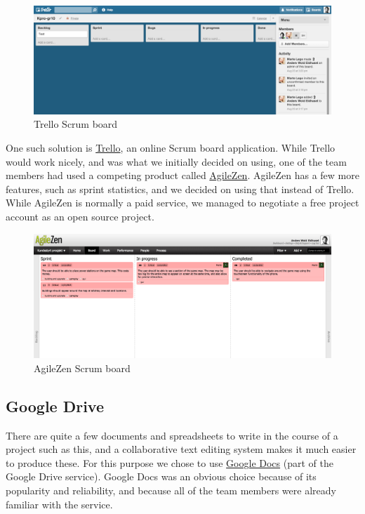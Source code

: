     \begin{figure}[htb]
      \centering
      \includegraphics[width=1\textwidth]{pictures/trello.png}
      \caption{Trello Scrum board}
    \end{figure}

    One such solution is \href{https://trello.com}{Trello}, an online Scrum
    board application. While Trello would work nicely, and was what we initially
    decided on using, one of the team members had used a competing product called
    \href{http://www.agilezen.com/}{AgileZen}. AgileZen has a few more features,
    such as sprint statistics, and we decided on using that instead of Trello.
    While AgileZen is normally a paid service, we managed to negotiate a free
    project account as an open source project.

    \begin{figure}[htb]
      \centering
      \includegraphics[width=1\textwidth]{pictures/agilezen.png}
      \caption{AgileZen Scrum board}
    \end{figure}

\subsection{Google Drive}
    There are quite a few documents and spreadsheets to write in the course
    of a project such as this, and a collaborative text editing system
    makes it much easier to produce these. For this purpose we chose to use
    \href{https://drive.google.com}{Google Docs} (part of the Google Drive
    service). Google Docs was an obvious choice because of its popularity and
    reliability, and because all of the team members were already familiar with the
    service.

